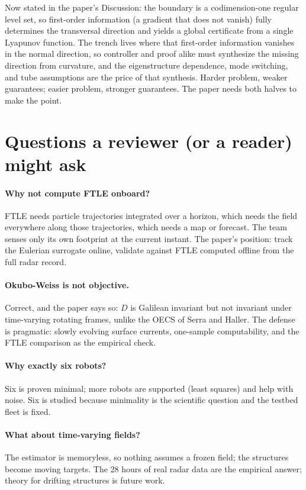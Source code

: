 \documentclass[11pt]{article}
\begin{document}
Now stated in the paper's Discussion: the boundary is a codimension-one
regular level set, so first-order information (a gradient that does not
vanish) fully determines the transversal direction and yields a global
certificate from a single Lyapunov function. The trench lives where that
first-order information vanishes in the normal direction, so controller
and proof alike must synthesize the missing direction from curvature, and
the eigenstructure dependence, mode switching, and tube assumptions are
the price of that synthesis. Harder problem, weaker guarantees; easier
problem, stronger guarantees. The paper needs both halves to make the
point.

\section{Questions a reviewer (or a reader) might ask}

\paragraph{Why not compute FTLE onboard?} FTLE needs particle trajectories
integrated over a horizon, which needs the field everywhere along those
trajectories, which needs a map or forecast. The team senses only its own
footprint at the current instant. The paper's position: track the Eulerian
surrogate online, validate against FTLE computed offline from the full
radar record.

\paragraph{Okubo-Weiss is not objective.} Correct, and the paper says so:
$D$ is Galilean invariant but not invariant under time-varying rotating
frames, unlike the OECS of Serra and Haller. The defense is pragmatic:
slowly evolving surface currents, one-sample computability, and the FTLE
comparison as the empirical check.

\paragraph{Why exactly six robots?} Six is proven minimal; more robots are
supported (least squares) and help with noise. Six is studied because
minimality is the scientific question and the testbed fleet is fixed.

\paragraph{What about time-varying fields?} The estimator is memoryless,
so nothing assumes a frozen field; the structures become moving targets.
The 28 hours of real radar data are the empirical answer; theory for
drifting structures is future work.
\end{document}
